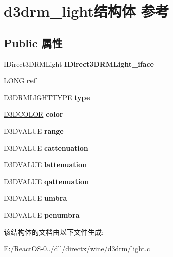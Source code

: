 \hypertarget{structd3drm__light}{}\section{d3drm\+\_\+light结构体 参考}
\label{structd3drm__light}
\subsection*{Public 属性}
\begin{DoxyCompactItemize}
\item 
\mbox{\label{structd3drm__light_a5cb24908cbe8d30a659ddb7376aa931c}} 
I\+Direct3\+D\+R\+M\+Light {\bfseries I\+Direct3\+D\+R\+M\+Light\+\_\+iface}
\item 
\mbox{\label{structd3drm__light_ae8e0d78acd2a6e815d6dc00c3f7906d6}} 
L\+O\+NG {\bfseries ref}
\item 
\mbox{\label{structd3drm__light_a5d9cbd63bd84f30a8c2c770bfdd06fe8}} 
D3\+D\+R\+M\+L\+I\+G\+H\+T\+T\+Y\+PE {\bfseries type}
\item 
\mbox{\label{structd3drm__light_aebdfd344392115d818ada6b6c1954592}} 
\hyperlink{struct_d3_d_c_o_l_o_r}{D3\+D\+C\+O\+L\+OR} {\bfseries color}
\item 
\mbox{\label{structd3drm__light_a8f11a88a0fb498485b1bfd6bded616a1}} 
D3\+D\+V\+A\+L\+UE {\bfseries range}
\item 
\mbox{\label{structd3drm__light_aaaf76d365d79e7613deed26475715e27}} 
D3\+D\+V\+A\+L\+UE {\bfseries cattenuation}
\item 
\mbox{\label{structd3drm__light_a467c5f9247f6886dc6a32bbf380c6512}} 
D3\+D\+V\+A\+L\+UE {\bfseries lattenuation}
\item 
\mbox{\label{structd3drm__light_a24392a818e7dcb90ecc8a34db4cc5e48}} 
D3\+D\+V\+A\+L\+UE {\bfseries qattenuation}
\item 
\mbox{\label{structd3drm__light_aa104a93c1e8dfd48de12400959192bea}} 
D3\+D\+V\+A\+L\+UE {\bfseries umbra}
\item 
\mbox{\label{structd3drm__light_a8dbf08fde99c52329052baff9267b5f9}} 
D3\+D\+V\+A\+L\+UE {\bfseries penumbra}
\end{DoxyCompactItemize}


该结构体的文档由以下文件生成\+:\begin{DoxyCompactItemize}
\item 
E\+:/\+React\+O\+S-\/0../dll/directx/wine/d3drm/light.\+c\end{DoxyCompactItemize}
